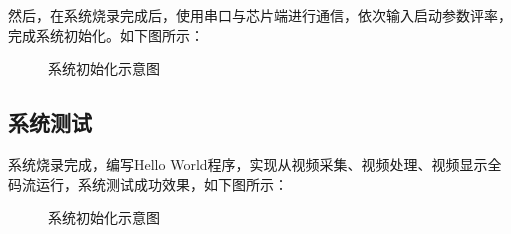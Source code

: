 然后，在系统烧录完成后，使用串口与芯片端进行通信，依次输入启动参数评率，完成系统初始化。如下图所示：

\begin{figure}[H]
    \caption{系统初始化示意图}
    \label{taurus-init}
\end{figure}  

\subsection{系统测试}
系统烧录完成，编写Hello World程序，实现从视频采集、视频处理、视频显示全码流运行，系统测试成功效果，如下图所示：
\begin{figure}[H]
    \caption{系统初始化示意图}
    \label{system-test}
\end{figure}  



